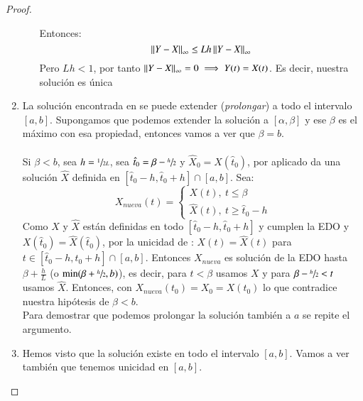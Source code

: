 \begin{proof}
\begin{enumerate}
\begin{enumerate}
        Entonces:
        $$
            \left|\left|Y-X\right|\right|_\infty \leq Lh \left|\left|Y-X\right|\right|_\infty
        $$
        Pero $Lh < 1$, por tanto $\left|\left|Y-X\right|\right|_\infty = 0 \implies Y(t) = X(t)$. Es decir, nuestra solución es única
    \end{enumerate}
        \item La solución encontrada en \label{proof:primera-parte-unic} se puede extender (\textit{prolongar}) a todo el intervalo $[a, b]$.
        Supongamos que podemos extender la solución a $[\alpha, \beta]$ y ese $\beta$ es el máximo con esa propiedad, entonces vamos a ver que $\beta = b$.\\\\
        Si $\beta < b$, sea $h = \sfrac{1}{2L}$, sea $\hat{t}_0 = \beta - \sfrac{h}{2}$ y $\hat{X}_0 = X(\hat{t}_0)$, por \label{proof:primera-parte-unic} aplicado da una solución $\hat{X}$ definida en $[\hat{t}_0 - h, \hat{t}_0 + h] \cap[a, b]$.
        Sea:
        $$
            X_{nueva}(t) =
            \begin{cases}
                X(t),\ t\leq \beta\\
                \hat{X}(t),\ t\geq \hat{t}_0 - h
        \end{cases}
        $$
        Como $X$ y $\hat{X}$ están definidas en todo $[\hat{t}_0 - h, \hat{t}_0 + h]$ y cumplen la EDO y $X(\hat{t}_0) = \hat{X}(\hat{t}_0)$, por la unicidad de  \label{proof:primera-parte-unic}: $X(t) = \hat{X}(t) $ para $t \in [\hat{t}_0 - h, \hat{t}_0 + h] \cap[a, b]$.
        Entonces $X_{nueva}$ es solución de la EDO hasta $\beta + \frac{h}{L}$ (o $\min(\beta + \sfrac{h}{2}, b)$), es decir, para $t < \beta$ usamos $X$ y para $\beta - \sfrac{h}{2} < t$ usamos $\hat{X}$. Entonces, con $X_{nueva}(t_0) = X_0 = X(t_0)$ lo que contradice nuestra hipótesis de $\beta < b$.\\
        Para demostrar que podemos prolongar la solución también a $a$ se repite el argumento.
        \item Hemos visto que la solución existe en todo el intervalo $[a, b]$. Vamos a ver también que tenemos unicidad en $[a, b]$.
        \begin{enumerate}

\end{enumerate}
\end{enumerate}
\end{proof}
